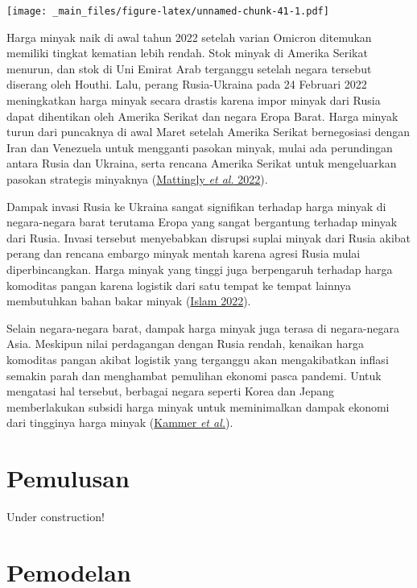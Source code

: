 \documentclass[
]{book}
\begin{document}
\texttt{[image: \_main\_files/figure-latex/unnamed-chunk-41-1.pdf]}

Harga minyak naik di awal tahun 2022 setelah varian Omicron ditemukan memiliki tingkat kematian lebih rendah. Stok minyak di Amerika Serikat menurun, dan stok di Uni Emirat Arab terganggu setelah negara tersebut diserang oleh Houthi. Lalu, perang Rusia-Ukraina pada 24 Februari 2022 meningkatkan harga minyak secara drastis karena impor minyak dari Rusia dapat dihentikan oleh Amerika Serikat dan negara Eropa Barat. Harga minyak turun dari puncaknya di awal Maret setelah Amerika Serikat bernegosiasi dengan Iran dan Venezuela untuk mengganti pasokan minyak, mulai ada perundingan antara Rusia dan Ukraina, serta rencana Amerika Serikat untuk mengeluarkan pasokan strategis minyaknya (\protect\hyperlink{ref-cnn_us_nodate}{Mattingly \emph{et al.} 2022}).

Dampak invasi Rusia ke Ukraina sangat signifikan terhadap harga minyak di negara-negara barat terutama Eropa yang sangat bergantung terhadap minyak dari Rusia. Invasi tersebut menyebabkan disrupsi suplai minyak dari Rusia akibat perang dan rencana embargo minyak mentah karena agresi Rusia mulai diperbincangkan. Harga minyak yang tinggi juga berpengaruh terhadap harga komoditas pangan karena logistik dari satu tempat ke tempat lainnya membutuhkan bahan bakar minyak (\protect\hyperlink{ref-islam_ukraine_nodate}{Islam 2022}).

Selain negara-negara barat, dampak harga minyak juga terasa di negara-negara Asia. Meskipun nilai perdagangan dengan Rusia rendah, kenaikan harga komoditas pangan akibat logistik yang terganggu akan mengakibatkan inflasi semakin parah dan menghambat pemulihan ekonomi pasca pandemi. Untuk mengatasi hal tersebut, berbagai negara seperti Korea dan Jepang memberlakukan subsidi harga minyak untuk meminimalkan dampak ekonomi dari tingginya harga minyak (\protect\hyperlink{ref-kammer_how_nodate}{Kammer \emph{et al.}}).

\hypertarget{pemulusan}{%
\chapter{Pemulusan}\label{pemulusan}}

Under construction!

\hypertarget{pemodelan}{%
\chapter{Pemodelan}\label{pemodelan}}
\end{document}
